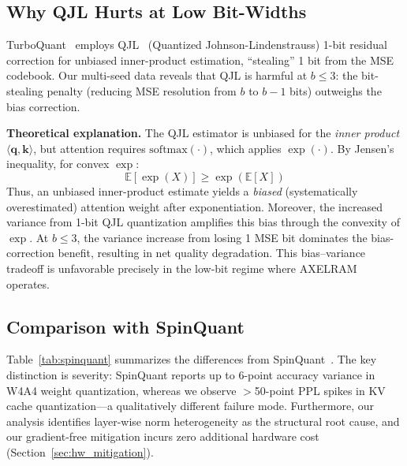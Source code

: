 \documentclass[conference]{IEEEtran}
\begin{document}
\subsection{Why QJL Hurts at Low Bit-Widths}
TurboQuant~\cite{turboquant} employs QJL~\cite{qjl} (Quantized Johnson-Lindenstrauss) 1-bit residual correction for unbiased inner-product estimation, ``stealing'' 1 bit from the MSE codebook.
Our multi-seed data reveals that QJL is harmful at $b \leq 3$:
the bit-stealing penalty (reducing MSE resolution from $b$ to $b{-}1$ bits) outweighs the bias correction.

\textbf{Theoretical explanation.}
The QJL estimator is unbiased for the \emph{inner product} $\langle \mathbf{q}, \mathbf{k} \rangle$, but attention requires $\mathrm{softmax}(\cdot)$, which applies $\exp(\cdot)$.
By Jensen's inequality, for convex $\exp$:
\begin{equation}
\mathbb{E}[\exp(X)] \geq \exp(\mathbb{E}[X])
\end{equation}
Thus, an unbiased inner-product estimate yields a \emph{biased} (systematically overestimated) attention weight after exponentiation.
Moreover, the increased variance from 1-bit QJL quantization amplifies this bias through the convexity of $\exp$.
At $b \leq 3$, the variance increase from losing 1 MSE bit dominates the bias-correction benefit, resulting in net quality degradation.
This bias--variance tradeoff is unfavorable precisely in the low-bit regime where AXELRAM operates.

\subsection{Comparison with SpinQuant}
Table~\ref{tab:spinquant} summarizes the differences from SpinQuant~\cite{spinquant}.
The key distinction is severity: SpinQuant reports up to 6-point accuracy variance in W4A4 weight quantization, whereas we observe $>$50-point PPL spikes in KV cache quantization---a qualitatively different failure mode.
Furthermore, our analysis identifies layer-wise norm heterogeneity as the structural root cause, and our gradient-free mitigation incurs zero additional hardware cost (Section~\ref{sec:hw_mitigation}).
\end{document}
